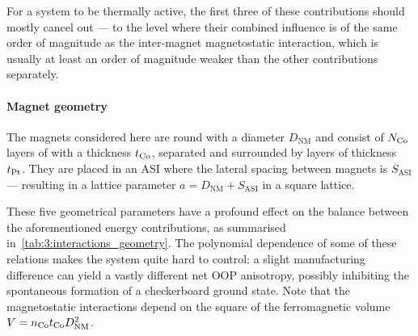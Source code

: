 For a system to be thermally active, the first three of these contributions should mostly cancel out --- to the level where their combined influence is of the same order of magnitude as the inter-magnet magnetostatic interaction, which is usually at least an order of magnitude weaker than the other contributions separately.

\paragraph{Magnet geometry}

The magnets considered here are round with a diameter $D_\mathrm{NM}$ and consist of $N_{\ce{Co}}$ layers of  with a thickness $t_{\ce{Co}}$, separated and surrounded by  layers of thickness $t_{\ce{Pt}}$.
They are placed in an ASI where the lateral spacing between magnets is $S_\mathrm{ASI}$ --- resulting in a lattice parameter $a=D_\mathrm{NM}+S_\mathrm{ASI}$ in a square lattice. \par
These five geometrical parameters have a profound effect on the balance between the aforementioned energy contributions, as summarised in~\cref{tab:3:interactions_geometry}.
The polynomial dependence of some of these relations makes the system quite hard to control: a slight manufacturing difference can yield a vastly different net OOP anisotropy, possibly inhibiting the spontaneous formation of a checkerboard ground state.
Note that the magnetostatic interactions depend on the square of the ferromagnetic volume $V=n_{\ce{Co}} t_{\ce{Co}} D_\mathrm{NM}^2$.


